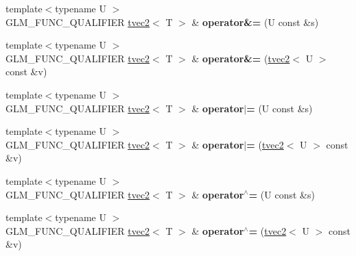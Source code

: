 \begin{DoxyCompactItemize}
\item 
\hypertarget{structglm_1_1detail_1_1tvec2_a0e24351d604ef07cf6a410f5a1379b39}{}{\footnotesize template$<$typename U $>$ }\\G\+L\+M\+\_\+\+F\+U\+N\+C\+\_\+\+Q\+U\+A\+L\+I\+F\+I\+E\+R \hyperlink{structglm_1_1detail_1_1tvec2}{tvec2}$<$ T $>$ \& {\bfseries operator\&=} (U const \&s)\label{structglm_1_1detail_1_1tvec2_a0e24351d604ef07cf6a410f5a1379b39}

\item 
\hypertarget{structglm_1_1detail_1_1tvec2_ac1fa283164396250b95e269a3a2a4792}{}{\footnotesize template$<$typename U $>$ }\\G\+L\+M\+\_\+\+F\+U\+N\+C\+\_\+\+Q\+U\+A\+L\+I\+F\+I\+E\+R \hyperlink{structglm_1_1detail_1_1tvec2}{tvec2}$<$ T $>$ \& {\bfseries operator\&=} (\hyperlink{structglm_1_1detail_1_1tvec2}{tvec2}$<$ U $>$ const \&v)\label{structglm_1_1detail_1_1tvec2_ac1fa283164396250b95e269a3a2a4792}

\item 
\hypertarget{structglm_1_1detail_1_1tvec2_a78eeb97a2cb7ea6fc34fea67f97275e6}{}{\footnotesize template$<$typename U $>$ }\\G\+L\+M\+\_\+\+F\+U\+N\+C\+\_\+\+Q\+U\+A\+L\+I\+F\+I\+E\+R \hyperlink{structglm_1_1detail_1_1tvec2}{tvec2}$<$ T $>$ \& {\bfseries operator$\vert$=} (U const \&s)\label{structglm_1_1detail_1_1tvec2_a78eeb97a2cb7ea6fc34fea67f97275e6}

\item 
\hypertarget{structglm_1_1detail_1_1tvec2_a22adb05ed8aaca90d76afbac9f0ed845}{}{\footnotesize template$<$typename U $>$ }\\G\+L\+M\+\_\+\+F\+U\+N\+C\+\_\+\+Q\+U\+A\+L\+I\+F\+I\+E\+R \hyperlink{structglm_1_1detail_1_1tvec2}{tvec2}$<$ T $>$ \& {\bfseries operator$\vert$=} (\hyperlink{structglm_1_1detail_1_1tvec2}{tvec2}$<$ U $>$ const \&v)\label{structglm_1_1detail_1_1tvec2_a22adb05ed8aaca90d76afbac9f0ed845}

\item 
\hypertarget{structglm_1_1detail_1_1tvec2_aa4f1d873eac0e0bbb75098c8dfb2feae}{}{\footnotesize template$<$typename U $>$ }\\G\+L\+M\+\_\+\+F\+U\+N\+C\+\_\+\+Q\+U\+A\+L\+I\+F\+I\+E\+R \hyperlink{structglm_1_1detail_1_1tvec2}{tvec2}$<$ T $>$ \& {\bfseries operator$^\wedge$=} (U const \&s)\label{structglm_1_1detail_1_1tvec2_aa4f1d873eac0e0bbb75098c8dfb2feae}

\item 
\hypertarget{structglm_1_1detail_1_1tvec2_a044083b585ddc318a228cbe6dea32027}{}{\footnotesize template$<$typename U $>$ }\\G\+L\+M\+\_\+\+F\+U\+N\+C\+\_\+\+Q\+U\+A\+L\+I\+F\+I\+E\+R \hyperlink{structglm_1_1detail_1_1tvec2}{tvec2}$<$ T $>$ \& {\bfseries operator$^\wedge$=} (\hyperlink{structglm_1_1detail_1_1tvec2}{tvec2}$<$ U $>$ const \&v)\label{structglm_1_1detail_1_1tvec2_a044083b585ddc318a228cbe6dea32027}


\end{DoxyCompactItemize}
